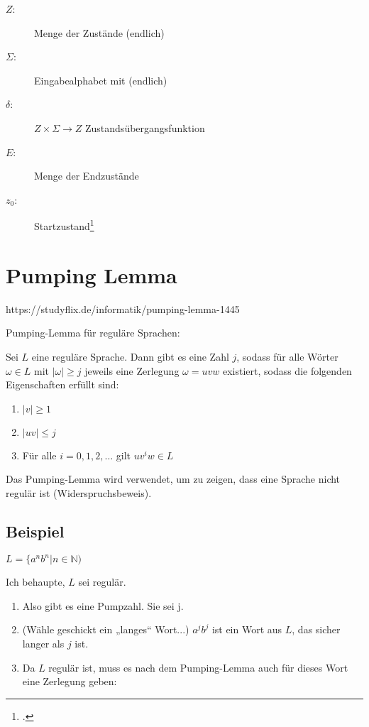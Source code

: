 \documentclass{lehramt-informatik-haupt}
\begin{document}
\begin{description}
\item[$Z$:] Menge der Zustände (endlich)
\item[$\Sigma$:] Eingabealphabet mit (endlich)
\item[$\delta$:] $Z \times \Sigma \rightarrow Z$ Zustandsübergangsfunktion
\item[$E$:] Menge der Endzustände
\item[$z_0$:] Startzustand\footcite[Seite 26]{theo:fs:1}
\end{description}

%

\section{Pumping Lemma}

https://studyflix.de/informatik/pumping-lemma-1445

Pumping-Lemma für reguläre Sprachen:

Sei $L$ eine reguläre Sprache. Dann gibt es eine Zahl $j$, sodass für
alle Wörter $ω ∈ L$ mit $|\omega| \geq j$ jeweils eine Zerlegung $\omega
= uvw$ existiert, sodass die folgenden Eigenschaften erfüllt sind:

\begin{enumerate}
\item $|v| \geq 1$
\item $|uv| \leq j$
\item Für alle $i = 0, 1, 2, \dots$ gilt $uv^iw \in L$
\end{enumerate}

Das Pumping-Lemma wird verwendet, um zu zeigen, dass eine
Sprache nicht regulär ist (Widerspruchsbeweis).

%

\subsection{Beispiel}

$L = \{a^n b^n | n \in \mathbb{N})$

Ich behaupte, $L$ sei regulär.

\begin{enumerate}
\item Also gibt es eine Pumpzahl. Sie sei j.
\item (Wähle geschickt ein „langes“ Wort...)
$a^j b^j$ ist ein Wort aus $L$, das sicher langer als $j$ ist.
\item Da $L$ regulär ist, muss es nach dem Pumping-Lemma auch für dieses
Wort eine Zerlegung geben:
\end{enumerate}
\end{document}
